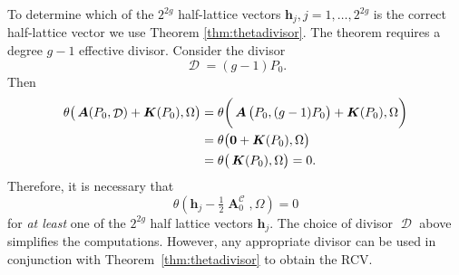 \documentclass[12pt]{article}
\theoremstyle{definition}
\DeclareMathOperator{\DivC}{\mathcal{C}}
\DeclareMathOperator{\DivD}{\mathcal{D}}
\DeclareMathOperator{\RCV}{\boldsymbol{K}}
\DeclareMathOperator{\Abel}{\boldsymbol{A}}
\begin{document}
To determine which of the $2^{2g}$ half-lattice vectors
$\boldsymbol{h}_j, j = 1, \ldots, 2^{2g}$ is the correct half-lattice
vector we use Theorem \ref{thm:thetadivisor}. The theorem requires a
degree $g-1$ effective divisor. Consider the divisor
\begin{equation} \label{eqn:simple-effective-divisor}
  \DivD = (g-1)P_0.
\end{equation}
Then
\begin{align}
  \theta\big(\Abel(P_0,\DivD) + \RCV(P_0), \Omega \big) \notag
  &=
  \theta\bigg(\Abel\big(P_0,(g-1)P_0\big) + \RCV(P_0), \Omega \bigg) \notag \\
  &=
  \theta\big(\boldsymbol{0} + \RCV(P_0), \Omega \big) \notag \\
  &=
  \theta\big(\RCV(P_0), \Omega \big) = 0.
\end{align}
Therefore, it is necessary that
\begin{equation}
  \theta\left(
  \boldsymbol{h}_j - \tfrac{1}{2} \Abel_0^{\DivC}, \Omega
  \right) = 0
\end{equation}
for {\it at least} one of the $2^{2g}$ half lattice vectors
$\boldsymbol{h}_j$. The choice of divisor $\DivD$ above simplifies the
computations. However, any appropriate divisor can be used in
conjunction with Theorem~\ref{thm:thetadivisor} to obtain the RCV.
\end{document}
